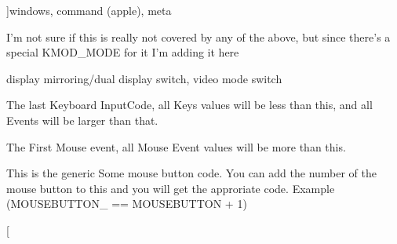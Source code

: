 \begin{Desc}
\begin{description}
{}]windows, command (apple), meta \item[{\em 
\hypertarget{classphys_1_1MetaCode_a3e501cbb5bf0f6f1fdb7211465bda8d8a9e26ea2006e876ccaa80fe4ae441da46}{
KEY\_\-MODE}
\label{classphys_1_1MetaCode_a3e501cbb5bf0f6f1fdb7211465bda8d8a9e26ea2006e876ccaa80fe4ae441da46}
}]I'm not sure if this is really not covered by any of the above, but since there's a special KMOD\_\-MODE for it I'm adding it here \item[{\em 
\hypertarget{classphys_1_1MetaCode_a3e501cbb5bf0f6f1fdb7211465bda8d8aadc4c974c86930fa73a693b7db4f7755}{
KEY\_\-DISPLAYSWITCH}
\label{classphys_1_1MetaCode_a3e501cbb5bf0f6f1fdb7211465bda8d8aadc4c974c86930fa73a693b7db4f7755}
}]display mirroring/dual display switch, video mode switch \item[{\em 
\hypertarget{classphys_1_1MetaCode_a3e501cbb5bf0f6f1fdb7211465bda8d8ac5e120aa1595bf2aa260df14b4a3498b}{
KEY\_\-LAST}
\label{classphys_1_1MetaCode_a3e501cbb5bf0f6f1fdb7211465bda8d8ac5e120aa1595bf2aa260df14b4a3498b}
}]The last Keyboard InputCode, all Keys values will be less than this, and all Events will be larger than that. \item[{\em 
\hypertarget{classphys_1_1MetaCode_a3e501cbb5bf0f6f1fdb7211465bda8d8a1bb7f008c7d430e886141a3b8b697129}{
MOUSE\_\-FIRST}
\label{classphys_1_1MetaCode_a3e501cbb5bf0f6f1fdb7211465bda8d8a1bb7f008c7d430e886141a3b8b697129}
}]The First Mouse event, all Mouse Event values will be more than this. \item[{\em 
\hypertarget{classphys_1_1MetaCode_a3e501cbb5bf0f6f1fdb7211465bda8d8a9cc80a2db206fb540fbb92a8ff64268a}{
MOUSEBUTTON}
\label{classphys_1_1MetaCode_a3e501cbb5bf0f6f1fdb7211465bda8d8a9cc80a2db206fb540fbb92a8ff64268a}
}]This is the generic Some mouse button code. You can add the number of the mouse button to this and you will get the approriate code. Example (MOUSEBUTTON\_ == MOUSEBUTTON + 1) \item[{\em 
}
\end{description}
\end{Desc}
